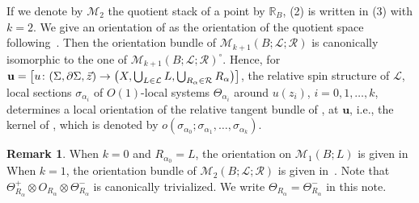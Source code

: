 \documentclass[pdftex]{sigma}
\numberwithin{equation}{section}
\theoremstyle{definition}
\newtheorem{rem}[thm]{Remark}
\begin{document}
If we denote by ${\mathcal M}_2$ the quotient stack of a point by ${\mathbb R}_B$, (2) is written in (3) with $k=2$.
We give an orientation of  as the orientation of the quotient space following~\cite[convention (8.2.1.2)]{FOOO09II}.
Then the orientation bundle of $ {\mathcal M}_{k+1}(B;{\mathcal L};{\mathcal R})$ is canonically isomorphic to the one of $ {\mathcal M}_{k+1}(B;{\mathcal L};{\mathcal R})^{\circ}$.
Hence, for
$
{\mathbf u}=\bigl[u\colon (\Sigma, \partial \Sigma, \vec{z}) \to \smash{\bigl(X, \bigcup_{L \in \mathcal L} L, \bigcup_{R_{\alpha} \in \mathcal R} R_{\alpha}\bigr)}\bigr]$,
the relative spin structure of $\mathcal L$, local sections $\sigma_{\alpha_i}$ of $O(1)$-local systems $\Theta_{\alpha_i}$ around $u(z_i)$, ${i = 0, 1, \dots, k}$,
determines a local orientation of the relative tangent bundle of
,
 at $\mathbf u$, i.e.,
the kernel of , which is denoted by ${\mathit o}(\sigma_{\alpha_0}; \sigma_{\alpha_1}, \dots, \sigma_{\alpha_k})$.

\begin{rem}
When $k=0$ and $R_{\alpha_0}=L$, the orientation on ${\mathcal M}_{1}(B;L)$ is given in~\cite[Section~8.4.1]{FOOO09II}
When $k=1$, the orientation bundle of ${\mathcal M}_{2}(B;{\mathcal L};{\mathcal R})$ is given in~\cite[Proposition~8.8.6]{FOOO09II}.
Note that $\Theta^+_{R_{\alpha}} \otimes O_{R_{\alpha}} \otimes \Theta^-_{R_{\alpha}}$ is canonically trivialized.
We write $\Theta_{R_{\alpha}}=\Theta_{R_{\alpha}}^-$ in this note.
\end{rem}
\end{document}
